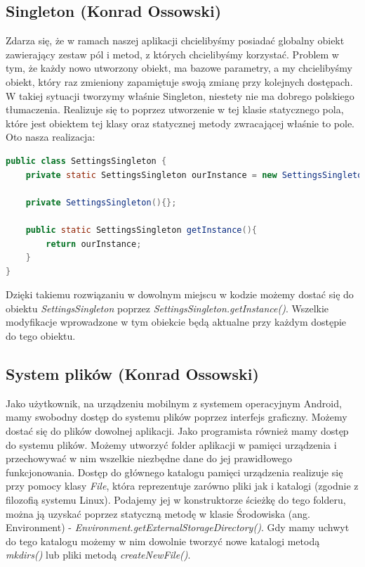 \subsection{Singleton (Konrad Ossowski)}
Zdarza się, że w ramach naszej aplikacji chcielibyśmy posiadać globalny obiekt zawierający zestaw pól i metod, z których chcielibyśmy korzystać. Problem w tym, że każdy nowo utworzony obiekt, ma bazowe parametry, a my chcielibyśmy obiekt, który raz zmieniony zapamiętuje swoją zmianę przy kolejnych dostępach. W takiej sytuacji tworzymy właśnie Singleton, niestety nie ma dobrego polskiego tłumaczenia. Realizuje się to poprzez utworzenie w tej klasie statycznego pola, które jest obiektem tej klasy oraz statycznej metody zwracającej właśnie to pole. Oto nasza realizacja:
\begin{lstlisting}[language=Java]
public class SettingsSingleton {
    private static SettingsSingleton ourInstance = new SettingsSingleton();
    
    private SettingsSingleton(){};
    
    public static SettingsSingleton getInstance(){
        return ourInstance;
    }
}
\end{lstlisting}
Dzięki takiemu rozwiązaniu w dowolnym miejscu w kodzie możemy dostać się do obiektu \textit{SettingsSingleton} poprzez \textit{SettingsSingleton.getInstance()}. Wszelkie modyfikacje wprowadzone w tym obiekcie będą aktualne przy każdym dostępie do tego obiektu.
\subsection{System plików (Konrad Ossowski)}
Jako użytkownik, na urządzeniu mobilnym z systemem operacyjnym Android, mamy swobodny dostęp do systemu plików poprzez interfejs graficzny. Możemy dostać się do plików dowolnej aplikacji. Jako programista również mamy dostęp do systemu plików. Możemy utworzyć folder aplikacji w pamięci urządzenia i przechowywać w nim wszelkie niezbędne dane do jej prawidłowego funkcjonowania. Dostęp do głównego katalogu pamięci urządzenia realizuje się przy pomocy klasy \textit{File}, która reprezentuje zarówno pliki jak i katalogi (zgodnie z filozofią systemu Linux). Podajemy jej w konstruktorze ścieżkę do tego folderu, można ją uzyskać poprzez statyczną metodę w klasie Środowiska (ang. Environment) -  \textit{Environment.getExternalStorageDirectory()}. Gdy mamy uchwyt do tego katalogu możemy w nim dowolnie tworzyć nowe katalogi metodą \textit{mkdirs()} lub pliki metodą \textit{createNewFile()}.
